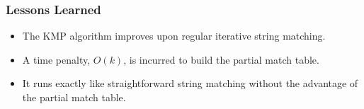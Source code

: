 \subsubsection{Lessons Learned}
\begin{itemize}
	\item The KMP algorithm improves upon regular iterative string matching.
	\item A time penalty, $O(k)$, is incurred to build the partial match table.
	\item It runs exactly like straightforward string matching without the advantage of the partial match table.
\end{itemize}


